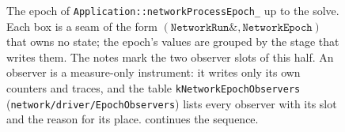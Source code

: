 \documentclass[main.tex]{subfiles}
\begin{document}
\begin{figure}[tbp]
{}
\caption{The epoch of \texttt{Application::networkProcessEpoch\_} up to the
solve. Each box is a seam of the form $(\texttt{NetworkRun\&},
\texttt{NetworkEpoch})$ that owns no state; the epoch's values are grouped by
the stage that writes them. The notes mark the two observer slots of this
half. An observer is a measure-only instrument: it writes only its own
counters and traces, and the table \texttt{kNetworkEpochObservers}
(\texttt{network/driver/EpochObservers}) lists every observer with its slot
and the reason for its place.  continues the
sequence.}
\label{fig:net-spine-pre}
\end{figure}
\end{document}
